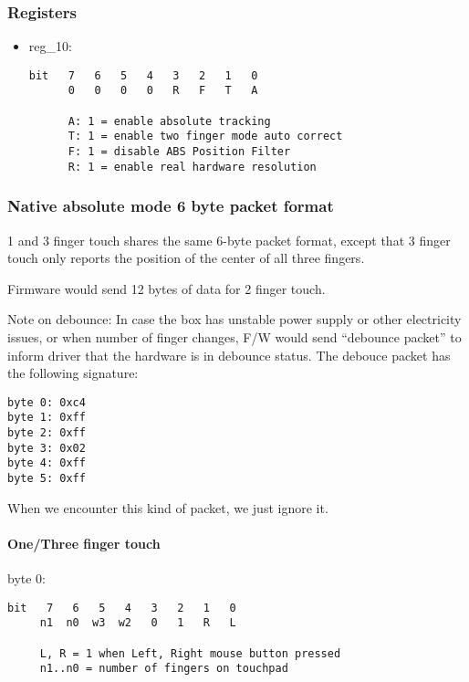 \documentclass[a4paper,8pt,english]{sphinxmanual}
\begin{document}
\subsubsection{Registers}
\label{input/devices/elantech:id2}\begin{itemize}
\item {} 
reg\_10:

\begin{Verbatim}[commandchars=\\\{\}]
bit   7   6   5   4   3   2   1   0
      0   0   0   0   R   F   T   A

      A: 1 = enable absolute tracking
      T: 1 = enable two finger mode auto correct
      F: 1 = disable ABS Position Filter
      R: 1 = enable real hardware resolution
\end{Verbatim}

\end{itemize}


\subsubsection{Native absolute mode 6 byte packet format}
\label{input/devices/elantech:id3}
1 and 3 finger touch shares the same 6-byte packet format, except that
3 finger touch only reports the position of the center of all three fingers.

Firmware would send 12 bytes of data for 2 finger touch.

Note on debounce:
In case the box has unstable power supply or other electricity issues, or
when number of finger changes, F/W would send ``debounce packet'' to inform
driver that the hardware is in debounce status.
The debouce packet has the following signature:

\begin{Verbatim}[commandchars=\\\{\}]
byte 0: 0xc4
byte 1: 0xff
byte 2: 0xff
byte 3: 0x02
byte 4: 0xff
byte 5: 0xff
\end{Verbatim}

When we encounter this kind of packet, we just ignore it.


\paragraph{One/Three finger touch}
\label{input/devices/elantech:id4}
byte 0:

\begin{Verbatim}[commandchars=\\\{\}]
bit   7   6   5   4   3   2   1   0
     n1  n0  w3  w2   0   1   R   L

     L, R = 1 when Left, Right mouse button pressed
     n1..n0 = number of fingers on touchpad
\end{Verbatim}
\end{document}
